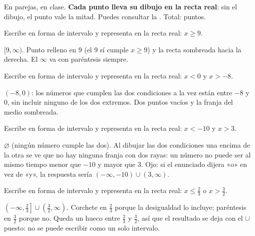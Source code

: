 \documentclass[11pt]{article}
\begin{document}
\encabezado

\begin{instrucciones}
En parejas, en clase. \textbf{Cada punto lleva su dibujo en la recta real}: sin el dibujo, el
punto vale la mitad. Puedes consultar la .
Total: \totalpuntos{} puntos.
\end{instrucciones}

\begin{preguntas}

\pregunta[0.5] Escribe en forma de intervalo y representa en la recta real: $x \ge 9$.
\espacio{2cm}
\begin{solucion}
$[9, \infty)$. Punto relleno en 9 (el 9 sí cumple $x \ge 9$) y la recta sombreada hacia la
derecha. El $\infty$ va con paréntesis siempre.
\end{solucion}

\pregunta[0.5] Escribe en forma de intervalo y representa en la recta real: $x < 0$ y $x > -8$.
\espacio{2cm}
\begin{solucion}
$(-8, 0)$: los números que cumplen las dos condiciones a la vez están entre $-8$ y $0$, sin
incluir ninguno de los dos extremos. Dos puntos vacíos y la franja del medio sombreada.
\end{solucion}

\pregunta[0.75] Escribe en forma de intervalo y representa en la recta real: $x < -10$ y
$x > 3$.
\espacio{2.5cm}
\begin{solucion}
$\varnothing$ (ningún número cumple las dos). Al dibujar las dos condiciones una encima de la
otra se ve que no hay ninguna franja con dos rayas: un número no puede ser al mismo tiempo
menor que $-10$ y mayor que $3$. Ojo: si el enunciado dijera «o» en vez de «y», la respuesta
sería $(-\infty, -10) \cup (3, \infty)$.
\end{solucion}

\pregunta[0.75] Escribe en forma de intervalo y representa en la recta real:
$x \le \frac{2}{3}$ o $x > \frac{3}{2}$.
\espacio{2.5cm}
\begin{solucion}
$\left(-\infty, \frac{2}{3}\right] \cup \left(\frac{3}{2}, \infty\right)$. Corchete en
$\frac{2}{3}$ porque la desigualdad lo incluye; paréntesis en $\frac{3}{2}$ porque no. Queda un
hueco entre $\frac{2}{3}$ y $\frac{3}{2}$, así que el resultado se deja con el $\cup$ puesto:
no se puede escribir como un solo intervalo.
\end{solucion}


\end{preguntas}
\end{document}
